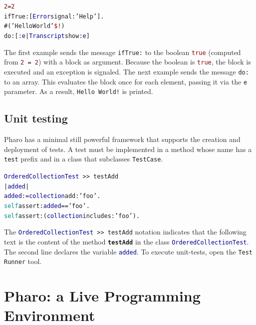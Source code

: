 \documentclass[notumble]{leaflet}
\makeatletter
\newenvironment{displaycode}{%
     \par
     \hspace{1.5em}\begin{minipage}{\linewidth}
       \begin{alltt}\small}{
       \end{alltt}
     \end{minipage}
     \par}
\newcommand{\code}[1]{\foreignlanguage{english}{\texttt{#1}}}
\makeatother
\begin{document}
\begin{displaycode}
\textcolor{darkRed}{2} = \textcolor{darkRed}{2}
  ifTrue: [\textcolor{darkBlue}{Error} signal: \textcolor{string}{'Help'}].
\#(\textcolor{string}{'Hello World'} \textcolor{darkRed}{\$!})
  do: [:\textcolor{darkBlue}{e} | \textcolor{darkBlue}{Transcript} show: \textcolor{darkBlue}{e}]
\end{displaycode}

The first example sends the message \code{ifTrue:} to the boolean
\textcolor{darkRed}{\code{true}} (computed from
\code{\textcolor{darkRed}{2} = \textcolor{darkRed}{2}}) with a block
as argument. Because the boolean is \textcolor{darkRed}{\code{true}},
the block is executed and an exception is signaled. The next example
sends the message \code{do:} to an array. This evaluates the block
once for each element, passing it via the \code{e} parameter. As a
result, \code{\textcolor{string}{Hello~World!}} is printed.

\subsection{Unit testing}

Pharo has a minimal still powerful framework that supports the
creation and deployment of tests. A test must be implemented in a
method whose name has a \code{test} prefix and in a class that
subclasses \code{TestCase}.

\begin{displaycode}
\textcolor{darkBlue}{OrderedCollectionTest}\,>>\,testAdd
  | \textcolor{darkBlue}{added} |
  \textcolor{darkBlue}{added} := \textcolor{darkBlue}{collection} add: \textcolor{string}{'foo'}.
  \textcolor{darkCyan}{self} assert: \textcolor{darkBlue}{added} == \textcolor{string}{'foo'}.
  \textcolor{darkCyan}{self} assert: (\textcolor{darkBlue}{collection} includes: \textcolor{string}{'foo'}).
\end{displaycode}

The \code{\textcolor{darkBlue}{OrderedCollectionTest}\,>{}>\,testAdd}
notation indicates that the following text is the content of the
method \code{\textbf{testAdd}} in the class
\code{\textcolor{darkBlue}{OrderedCollectionTest}}. The second line
declares the variable \code{\textcolor{darkBlue}{added}}. To execute
unit-tests, open the \code{Test Runner} tool.

\clearpage
\section{Pharo: a Live Programming Environment}
\end{document}
